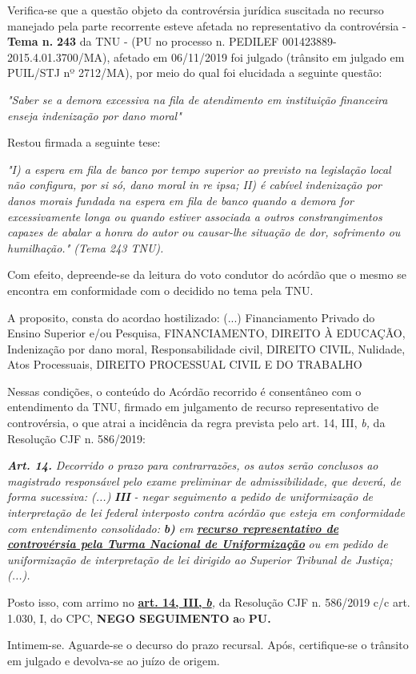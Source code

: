 \documentclass[12pt]{article}
\begin{document}
\justifying
\noindent Verifica-se que a questão objeto da controvérsia jurídica suscitada no recurso manejado pela parte recorrente esteve afetada no representativo da controvérsia - \textbf{Tema n. }\textbf{243} da TNU - (PU no processo n. PEDILEF 001423889-2015.4.01.3700/MA),  afetado em 06/11/2019 foi julgado (trânsito em julgado em PUIL/STJ nº 2712/MA), por meio do qual foi elucidada a seguinte questão:

\noindent \textit{"Saber se a demora excessiva na fila de atendimento em instituição financeira enseja indenização por dano moral"}

\noindent Restou firmada a seguinte tese:

\noindent \textit{"I) a espera em fila de banco por tempo superior ao previsto na legislação local não configura, por si só, dano moral in re ipsa; II) é cabível indenização por danos morais fundada na espera em fila de banco quando a demora for excessivamente longa ou quando estiver associada a outros constrangimentos capazes de abalar a honra do autor ou causar-lhe situação de dor, sofrimento ou humilhação." (Tema 243 TNU).}

\noindent Com efeito, depreende-se da leitura do voto condutor do acórdão que o mesmo se encontra em conformidade com o decidido no  tema pela TNU.

\noindent A proposito, consta do acordao hostilizado: (...) Financiamento Privado do Ensino Superior e/ou Pesquisa, FINANCIAMENTO, DIREITO À EDUCAÇÃO, Indenização por dano moral, Responsabilidade civil, DIREITO CIVIL, Nulidade, Atos Processuais, DIREITO PROCESSUAL CIVIL E DO TRABALHO

\noindent Nessas condições, o conteúdo do Acórdão recorrido é consentâneo com o entendimento da TNU, firmado em julgamento de recurso representativo de controvérsia, o que atrai a incidência da regra prevista pelo art. 14, III, \textit{b,} da Resolução CJF n. 586/2019:

\noindent \textit{\textbf{Art. 14.}}\textit{ Decorrido o prazo para contrarrazões, os autos serão conclusos ao magistrado responsável pelo exame preliminar de admissibilidade, que deverá, de forma sucessiva: (...) }\textit{\textbf{III }}\textit{- negar seguimento a pedido de uniformização de interpretação de lei federal interposto contra acórdão que esteja em conformidade com entendimento consolidado: }\textit{\textbf{b)}}\textit{ em }\uline{\textit{\textbf{recurso representativo de controvérsia pela Turma Nacional de Uniformização}}}\textit{ ou em pedido de uniformização de interpretação de lei dirigido ao Superior Tribunal de Justiça;(...).}

\noindent Posto isso, com arrimo no \uline{\textbf{art. 14, III, }}\uline{\textit{\textbf{b}}}\textit{,} da Resolução CJF n. 586/2019 c/c art. 1.030, I, do CPC, \textbf{NEGO SEGUIMENTO }\textbf{a}o\textbf{ PU}\textbf{.}

\noindent Intimem-se. Aguarde-se o decurso do prazo recursal. Após, certifique-se o trânsito em julgado e devolva-se ao juízo de origem.
\end{document}
